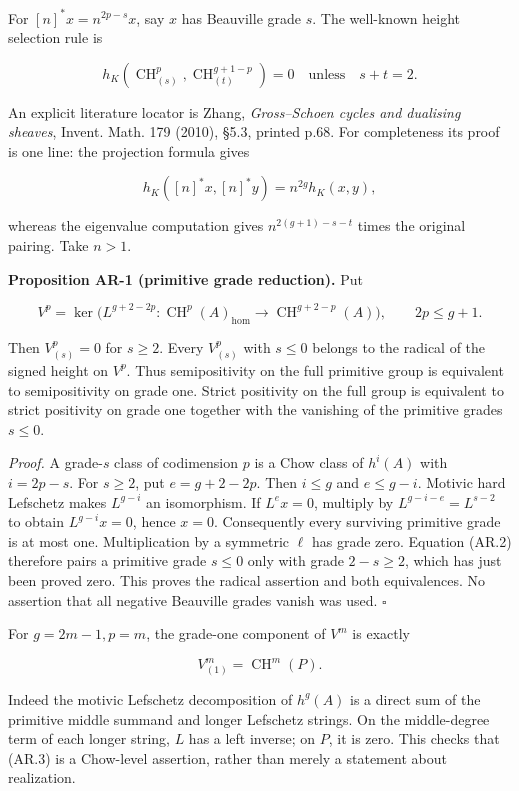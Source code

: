 For \([n]^*x=n^{2p-s}x\), say \(x\) has Beauville grade \(s\). The
well-known height selection rule is

\[
h_K(\operatorname{CH}^p_{(s)},\operatorname{CH}^{g+1-p}_{(t)})=0
\quad\text{unless}\quad s+t=2.
\tag{AR.2}
\]

An explicit literature locator is Zhang, \emph{Gross--Schoen cycles and
dualising sheaves}, Invent. Math. 179 (2010), §5.3, printed p.68. For
completeness its proof is one line: the projection formula gives

\[
h_K([n]^*x,[n]^*y)=n^{2g}h_K(x,y),
\]

whereas the eigenvalue computation gives \(n^{2(g+1)-s-t}\) times the
original pairing. Take \(n>1\).

\textbf{Proposition AR-1 (primitive grade reduction).} Put

\[
V^p=\ker\bigl(L^{g+2-2p}:\operatorname{CH}^p(A)_{\mathrm{hom}}
\longrightarrow\operatorname{CH}^{g+2-p}(A)\bigr),\qquad 2p\le g+1.
\]

Then \(V^p_{(s)}=0\) for \(s\ge2\). Every \(V^p_{(s)}\) with \(s\le0\)
belongs to the radical of the signed height on \(V^p\). Thus
semipositivity on the full primitive group is equivalent to
semipositivity on grade one. Strict positivity on the full group is
equivalent to strict positivity on grade one together with the vanishing
of the primitive grades \(s\le0\).

\emph{Proof.} A grade-\(s\) class of codimension \(p\) is a Chow class
of \(h^i(A)\) with \(i=2p-s\). For \(s\ge2\), put \(e=g+2-2p\). Then
\(i\le g\) and \(e\le g-i\). Motivic hard Lefschetz makes \(L^{g-i}\) an
isomorphism. If \(L^e x=0\), multiply by \(L^{g-i-e}=L^{s-2}\) to obtain
\(L^{g-i}x=0\), hence \(x=0\). Consequently every surviving primitive
grade is at most one. Multiplication by a symmetric \(\ell\) has grade
zero. Equation (AR.2) therefore pairs a primitive grade \(s\le0\) only
with grade \(2-s\ge2\), which has just been proved zero. This proves the
radical assertion and both equivalences. No assertion that all negative
Beauville grades vanish was used. \(\square\)

For \(g=2m-1,p=m\), the grade-one component of \(V^m\) is exactly

\[
V^m_{(1)}=\operatorname{CH}^m(P).
\tag{AR.3}
\]

Indeed the motivic Lefschetz decomposition of \(h^g(A)\) is a direct sum
of the primitive middle summand and longer Lefschetz strings. On the
middle-degree term of each longer string, \(L\) has a left inverse; on
\(P\), it is zero. This checks that (AR.3) is a Chow-level assertion,
rather than merely a statement about realization.

